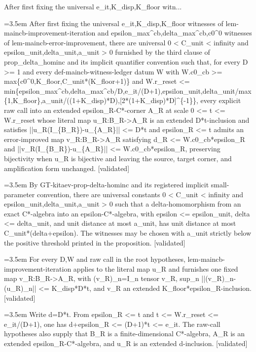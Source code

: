 \documentclass{article}
\newcommand{\step}[1]{\par\noindent\hangindent=3.5em\hangafter=1%
  \makebox[3.5em][l]{\textbf{#1.}}}
\newcommand{\steptag}[1]{\hfill{\small\textsf{[#1]}}}
\begin{document}
\begin{proofbox}{After first fixing the universal e\_it,K\_disp,K\_floor witn...}
\step{1} After first fixing the universal e\_it,K\_disp,K\_floor witnesses of lem-maincb-improvement-iteration and epsilon\_max\textasciicircum{}cb,delta\_max\textasciicircum{}cb,c0\textasciicircum{}0 witnesses of lem-maincb-error-improvement, there are universal 0 < C\_unit < infinity and epsilon\_unit,delta\_unit,a\_unit > 0 furnished by the third clause of prop\_delta\_hominc and its implicit quantifier convention such that, for every D >= 1 and every def-maincb-witness-ledger datum W with W.c0\_cb >= max\{c0\textasciicircum{}0,K\_floor,C\_unit*(K\_floor+1)\} and W.r\_reset <= min\{epsilon\_max\textasciicircum{}cb,delta\_max\textasciicircum{}cb/D,e\_it/(D+1),epsilon\_unit,delta\_unit/max\{1,K\_floor\},a\_unit/((1+K\_disp)*D),[2*(1+K\_disp)*D]\textasciicircum{}\{-1\}\}, every explicit raw call into an extended epsilon\_R-C*-corner A\_R at scale 0 <= t <= W.r\_reset whose literal map u\_R:B\_R->A\_R is an extended D*t-inclusion and satisfies ||u\_R(I\_\{B\_R\})-u\_\{A\_R\}|| <= D*t and epsilon\_R <= t admits an error-improved map v\_R:B\_R->A\_R satisfying d\_R <= W.c0\_cb*epsilon\_R and ||v\_R(I\_\{B\_R\})-u\_\{A\_R\}|| <= W.c0\_cb*epsilon\_R, preserving bijectivity when u\_R is bijective and leaving the source, target corner, and amplification form unchanged. \steptag{validated} \\[6pt]
\step{1.1} By GT-kitaev-prop-delta-hominc and its registered implicit small-parameter convention, there are universal constants 0 < C\_unit < infinity and epsilon\_unit,delta\_unit,a\_unit > 0 such that a delta-homomorphism from an exact C*-algebra into an epsilon-C*-algebra, with epsilon <= epsilon\_unit, delta <= delta\_unit, and unit distance at most a\_unit, has unit distance at most C\_unit*(delta+epsilon). The witnesses may be chosen with a\_unit strictly below the positive threshold printed in the proposition. \steptag{validated} \\[4pt]
\step{1.2} For every D,W and raw call in the root hypotheses, lem-maincb-improvement-iteration applies to the literal map u\_R and furnishes one fixed map v\_R:B\_R->A\_R, with (v\_R)\_n=I\_n tensor v\_R, sup\_n ||(v\_R)\_n-(u\_R)\_n|| <= K\_disp*D*t, and v\_R an extended K\_floor*epsilon\_R-inclusion. \steptag{validated} \\[6pt]
\step{1.2.1} Write d=D*t. From epsilon\_R <= t and t <= W.r\_reset <= e\_it/(D+1), one has d+epsilon\_R <= (D+1)*t <= e\_it. The raw-call hypotheses also supply that B\_R is a finite-dimensional C*-algebra, A\_R is an extended epsilon\_R-C*-algebra, and u\_R is an extended d-inclusion. \steptag{validated} \\[4pt]

\end{proofbox}
\end{document}
